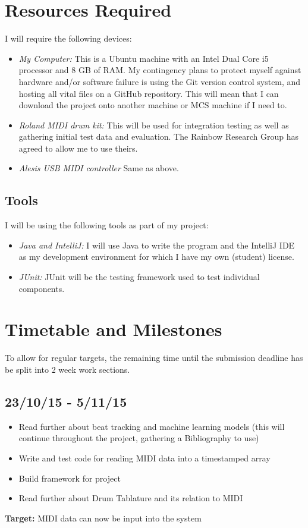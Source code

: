 \documentclass[12pt,a4]{article}
\begin{document}
	\section{\label{sec:Resources}Resources Required}
	I will require the following devices:
		\begin{itemize}
			\item \emph{My Computer:} This is a Ubuntu machine with an Intel Dual Core i5 processor and 8 GB of RAM. My contingency plans to protect myself against hardware and/or software failure is using the Git version control system, and hosting all vital files on a GitHub repository. This will mean that I can download the project onto another machine or MCS machine if I need to.
			\item \emph{Roland MIDI drum kit:} This will be used for integration testing as well as gathering initial test data and evaluation. The Rainbow Research Group has agreed to allow me to use theirs.
			\item \emph{Alesis USB MIDI controller} Same as above.
		\end{itemize}
		\subsection{Tools}
			I will be using the following tools as part of my project:
			\begin{itemize}
				\item \emph{Java and IntelliJ:} I will use Java to write the program and the IntelliJ IDE as my development environment for which I have my own (student) license.
				\item \emph{JUnit:} JUnit will be the testing framework used to test individual components.
			\end{itemize}
	\section{Timetable and Milestones}
To allow for regular targets, the remaining time until the submission deadline has be split into 2 week work sections. 

		\subsection{23/10/15 - 5/11/15}
		\begin{itemize}
			\item Read further about beat tracking and machine learning models (this will continue throughout the project, gathering a Bibliography to use)
			\item Write and test code for reading MIDI data into a timestamped array
			\item Build framework for project
			\item Read further about Drum Tablature and its relation to MIDI
		\end{itemize}
{\bf Target:} MIDI data can now be input into the system
\end{document}
